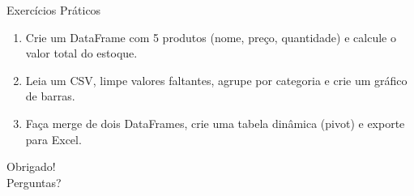 \documentclass[aspectratio=169]{beamer}
\begin{document}
\begin{frame}{Exercícios Práticos}
  \begin{enumerate}
    \item Crie um DataFrame com 5 produtos (nome, preço, quantidade) e calcule o valor total do estoque.
    \item Leia um CSV, limpe valores faltantes, agrupe por categoria e crie um gráfico de barras.
    \item Faça merge de dois DataFrames, crie uma tabela dinâmica (pivot) e exporte para Excel.
  \end{enumerate}
\end{frame}

\begin{frame}
  \centering
  \Large Obrigado! \\
  \vspace{0.5em}
  \normalsize Perguntas?
\end{frame}
\end{document}
